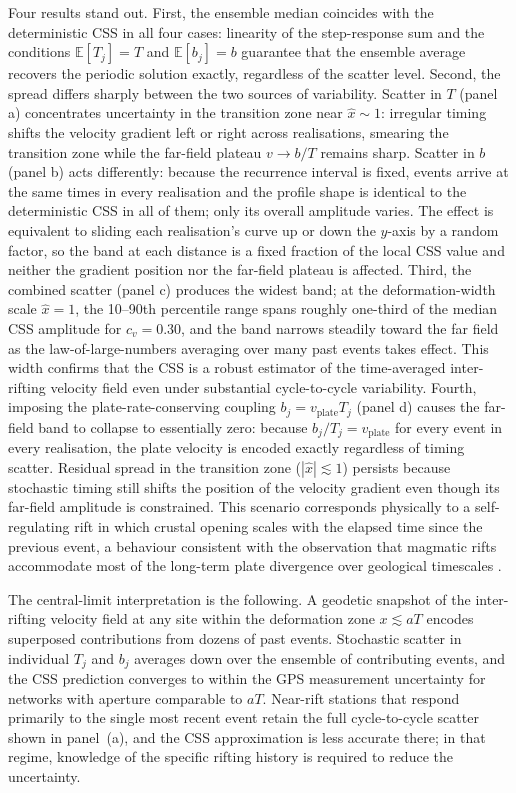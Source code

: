 \documentclass[extra]{gji}
\begin{document}
Four results stand out.  First, the ensemble median coincides with the
deterministic CSS in all four cases: linearity of the step-response sum and
the conditions $\mathbb{E}[T_j] = T$ and $\mathbb{E}[b_j] = b$
guarantee that the ensemble average recovers the periodic solution exactly,
regardless of the scatter level.  Second, the spread differs sharply between
the two sources of variability.  Scatter in $T$ (panel a) concentrates
uncertainty in the transition zone near $\hat{x}\sim 1$: irregular timing
shifts the velocity gradient left or right across realisations, smearing the
transition zone while the far-field plateau $v \to b/T$ remains sharp.
Scatter in $b$ (panel b) acts differently: because the recurrence
interval is fixed, events arrive at the same times in every realisation and
the profile shape is identical to the deterministic CSS in all of them;
only its overall amplitude varies.  The effect is equivalent to sliding each
realisation's curve up or down the $y$-axis by a random factor, so the band
at each distance is a fixed fraction of the local CSS value and neither the
gradient position nor the far-field plateau is affected.  Third, the combined scatter
(panel c) produces the widest band; at the deformation-width scale
$\hat{x} = 1$, the 10--90th percentile range spans roughly one-third of the
median CSS amplitude for $c_v = 0.30$, and the band narrows steadily toward
the far field as the law-of-large-numbers averaging over many past events
takes effect.  This width confirms that the CSS is a robust estimator of the
time-averaged inter-rifting velocity field even under substantial cycle-to-cycle
variability.  Fourth, imposing the plate-rate-conserving coupling
$b_j = v_{\mathrm{plate}} T_j$ (panel d) causes the far-field band to
collapse to essentially zero: because $b_j/T_j = v_{\mathrm{plate}}$
for every event in every realisation, the plate velocity is encoded exactly
regardless of timing scatter.  Residual spread in the transition zone
($|\hat{x}| \lesssim 1$) persists because stochastic timing still shifts
the position of the velocity gradient even though its far-field amplitude is
constrained.  This scenario corresponds physically to a self-regulating rift
in which crustal opening scales with the elapsed time since the previous
event, a behaviour consistent with the observation that magmatic rifts
accommodate most of the long-term plate divergence over geological timescales
\citep{thordarson2007volcanism}.

The central-limit interpretation is the following.  A geodetic snapshot of
the inter-rifting velocity field at any site within the deformation zone
$x \lesssim aT$ encodes superposed contributions from dozens of past events.
Stochastic scatter in individual $T_j$ and $b_j$ averages down over
the ensemble of contributing events, and the CSS prediction converges to
within the GPS measurement uncertainty for networks with aperture comparable
to $aT$.  Near-rift stations that respond primarily to the single most recent
event retain the full cycle-to-cycle scatter shown in panel~(a), and the CSS
approximation is less accurate there; in that regime, knowledge of the specific
rifting history is required to reduce the uncertainty.
\end{document}
